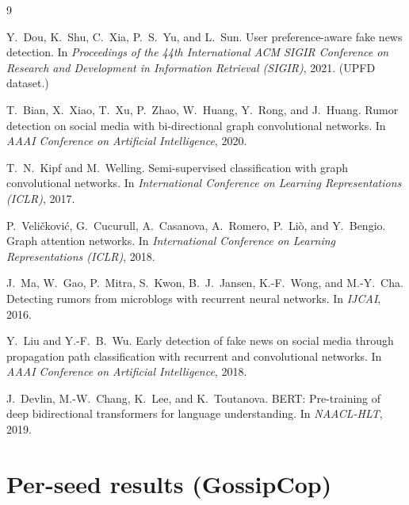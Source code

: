 \documentclass[10pt,twocolumn]{article}
\begin{document}
\begin{thebibliography}{9}
\small

Y.~Dou, K.~Shu, C.~Xia, P.~S.~Yu, and L.~Sun.
\newblock User preference-aware fake news detection.
\newblock In \emph{Proceedings of the 44th International ACM SIGIR Conference on
Research and Development in Information Retrieval (SIGIR)}, 2021. (UPFD dataset.)

T.~Bian, X.~Xiao, T.~Xu, P.~Zhao, W.~Huang, Y.~Rong, and J.~Huang.
\newblock Rumor detection on social media with bi-directional graph
convolutional networks.
\newblock In \emph{AAAI Conference on Artificial Intelligence}, 2020.

T.~N.~Kipf and M.~Welling.
\newblock Semi-supervised classification with graph convolutional networks.
\newblock In \emph{International Conference on Learning Representations
(ICLR)}, 2017.

P.~Veli\v{c}kovi\'{c}, G.~Cucurull, A.~Casanova, A.~Romero, P.~Li\`{o}, and
Y.~Bengio.
\newblock Graph attention networks.
\newblock In \emph{International Conference on Learning Representations
(ICLR)}, 2018.

J.~Ma, W.~Gao, P.~Mitra, S.~Kwon, B.~J.~Jansen, K.-F.~Wong, and M.-Y.~Cha.
\newblock Detecting rumors from microblogs with recurrent neural networks.
\newblock In \emph{IJCAI}, 2016.

Y.~Liu and Y.-F.~B.~Wu.
\newblock Early detection of fake news on social media through propagation
path classification with recurrent and convolutional networks.
\newblock In \emph{AAAI Conference on Artificial Intelligence}, 2018.

J.~Devlin, M.-W.~Chang, K.~Lee, and K.~Toutanova.
\newblock BERT: Pre-training of deep bidirectional transformers for language
understanding.
\newblock In \emph{NAACL-HLT}, 2019.

\end{thebibliography}

\appendix
\section{Per-seed results (GossipCop)}
\label{app:perseed}
\end{document}
